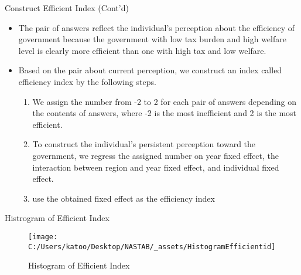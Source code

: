 \documentclass[
  ignorenonframetext,
]{beamer}
\providecommand{\tightlist}{%
  \setlength{\itemsep}{0pt}\setlength{\parskip}{0pt}}
\begin{document}
\begin{frame}{Construct Efficient Index (Cont'd)}
\protect\hypertarget{construct-efficient-index-contd}{}
\begin{itemize}
\tightlist
\item
  The pair of answers reflect the individual's perception about the efficiency of government because the government with low tax burden and high welfare level is clearly more efficient than one with high tax and low welfare.
\item
  Based on the pair about current perception, we construct an index called efficiency index by the following steps.

  \begin{enumerate}
  \tightlist
  \item
    We assign the number from -2 to 2 for each pair of answers depending on the contents of answers, where -2 is the most inefficient and 2 is the most efficient.
  \item
    To construct the individual's persistent perception toward the government, we regress the assigned number on year fixed effect, the interaction between region and year fixed effect, and individual fixed effect.
  \item
    use the obtained fixed effect as the efficiency index
  \end{enumerate}
\end{itemize}
\end{frame}

\begin{frame}{Histrogram of Efficient Index}
\protect\hypertarget{histrogram-of-efficient-index}{}
\begin{figure}

{\centering \texttt{[image: C:/Users/katoo/Desktop/NASTAB/\_assets/HistogramEfficientid]} 

}

\caption{Histogram of Efficient Index}\label{fig:unnamed-chunk-1}
\end{figure}
\end{frame}
\end{document}
